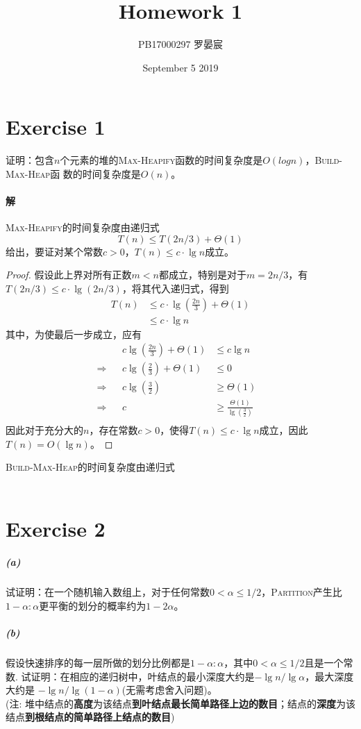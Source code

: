 \documentclass{article}
\title{Homework 1}
\author{PB17000297 罗晏宸}
\date{September 5 2019}
\begin{document}
\maketitle

\section{Exercise 1}
证明：包含$n$个元素的堆的\textsc{Max-Heapify}函数的时间复杂度是$O(logn)$，\textsc{Build-Max-Heap}函
数的时间复杂度是$O(n)$。
\\

\paragraph{解}
\textsc{Max-Heapify}的时间复杂度由递归式
\begin{equation*}
    T(n) \leq T(2n/3) + \Theta(1)
\end{equation*}
给出，要证对某个常数$c > 0$，$T(n) \leq c \cdot \lg{n}$成立。
\begin{proof}
假设此上界对所有正数$m < n$都成立，特别是对于$m =  2n/3$，有$T( 2n/3 ) \leq c \cdot \lg{(2n/3)}$，将其代入递归式，得到
\begin{align*}
    T(n) &\leq c \cdot \lg{\left(\frac{2n}{3}\right)} + \Theta(1) \\
    &\leq c \cdot \lg{n} 
\end{align*}
其中，为使最后一步成立，应有
\begin{align*}
    && c \lg{\left(\frac{2n}{3}\right)} + \Theta(1) &\leq c \lg{n}& \\
    \Rightarrow && c \lg{\left( \frac{2}{3} \right)} + \Theta(1) &\leq 0 & \\
    \Rightarrow && c \lg{\left( \frac{3}{2} \right)} &\geq \Theta(1) & \\
    \Rightarrow && c &\geq \frac{\Theta(1)}{\lg{\left( \frac{3}{2} \right)}}& \\
\end{align*}
因此对于充分大的$n$，存在常数$c > 0$，使得$T(n) \leq c \cdot \lg{n}$成立，因此$T(n) = O(\lg{n})$。
\end{proof}
\textsc{Build-Max-Heap}的时间复杂度由递归式
\begin{equation*}
    
\end{equation*}
\\

\section{Exercise 2}
\subparagraph{(a)}
试证明：在一个随机输入数组上，对于任何常数$0 < \alpha \leq 1/2$，\textsc{Partition}产生比$1−\alpha : \alpha$更平衡的划分的概率约为$1−2\alpha$。
\subparagraph{(b)}
假设快速排序的每一层所做的划分比例都是$1−\alpha : \alpha$，其中$0 < \alpha \leq 1/2$且是一个常数. 试证明：在相应的递归树中，叶结点的最小深度大约是$−\lg{n}/\lg{\alpha}$，最大深度大约是 $−\lg{n}/\lg{(1−\alpha)}$(无需考虑舍入问题)。\\
(注: 堆中结点的\textbf{高度}为该结点\textbf{到叶结点最长简单路径上边的数目}；结点的\textbf{深度}为该结点\textbf{到根结点的简单路径上结点的数目})
\\
\end{document}

